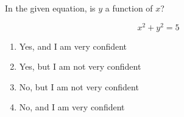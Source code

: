 \bigskip

\item In the given equation, is $y$ a function of $x$?

$$
x^2 + y^2 = 5
$$

\begin{enumerate}
\item Yes, and I am very confident  
\item Yes, but I am not very confident
\item No, but I am not very confident
\item No, and I am very confident  
\end{enumerate}


